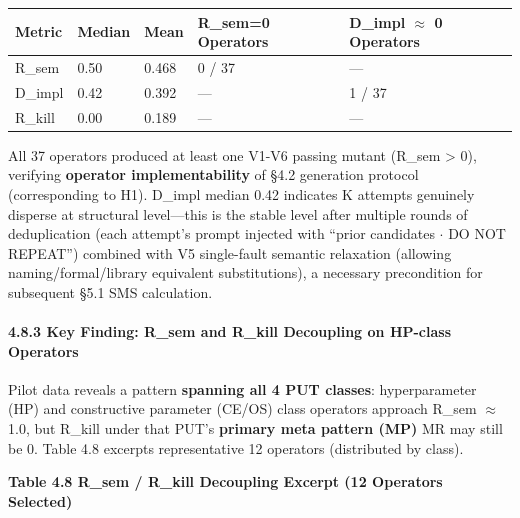 \documentclass[review,12pt,authoryear]{elsarticle}
\begin{document}
{\def\LTcaptype{none} %
\begin{longtable}[]{@{}lllll@{}}
\toprule\noalign{}
Metric & Median & Mean & R\_sem=0 Operators & D\_impl $\approx$ 0 Operators \\
\midrule\noalign{}
\endhead
\bottomrule\noalign{}
\endlastfoot
R\_sem & 0.50 & 0.468 & 0 / 37 & --- \\
D\_impl & 0.42 & 0.392 & --- & 1 / 37 \\
R\_kill & 0.00 & 0.189 & --- & --- \\
\end{longtable}
}

All 37 operators produced at least one V1-V6 passing mutant (R\_sem
\textgreater{} 0), verifying \textbf{operator implementability} of §4.2
generation protocol (corresponding to H1). D\_impl median 0.42 indicates
K attempts genuinely disperse at structural level---this is the stable
level after multiple rounds of deduplication (each attempt's prompt
injected with ``prior candidates $\cdot$ DO NOT REPEAT'') combined with V5
single-fault semantic relaxation (allowing naming/formal/library
equivalent substitutions), a necessary precondition for subsequent §5.1
SMS calculation.

\paragraph{4.8.3 Key Finding: R\_sem and R\_kill Decoupling on HP-class
Operators}\label{key-finding-r_sem-and-r_kill-decoupling-on-hp-class-operators}

Pilot data reveals a pattern \textbf{spanning all 4 PUT classes}:
hyperparameter (HP) and constructive parameter (CE/OS) class operators
approach R\_sem $\approx$ 1.0, but R\_kill under that PUT's \textbf{primary meta
pattern (MP)} MR may still be 0. Table 4.8 excerpts representative 12
operators (distributed by class).

\textbf{Table 4.8 R\_sem / R\_kill Decoupling Excerpt (12 Operators
Selected)}
\end{document}
